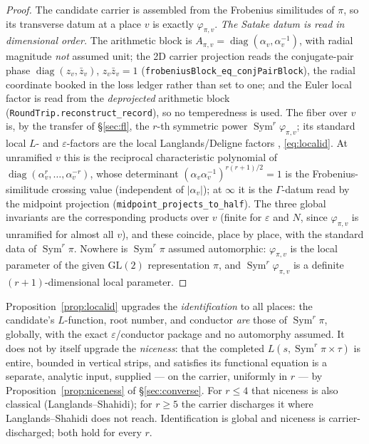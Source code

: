\documentclass[11pt]{article}
\theoremstyle{definition}
\newcommand{\Sym}{\operatorname{Sym}}
\begin{document}
\begin{proof}
The candidate carrier is assembled from the Frobenius similitudes of $\pi$, so its transverse datum at a
place $v$ is exactly $\varphi_{\pi,v}$. \emph{The Satake datum is read in dimensional order.} The arithmetic
block is $A_{\pi,v}=\operatorname{diag}(\alpha_v,\alpha_v^{-1})$, with radial magnitude \emph{not} assumed
unit; the 2D carrier projection reads the conjugate-pair phase $\operatorname{diag}(z_v,\bar z_v)$, $z_v\bar
z_v=1$ (\texttt{frobeniusBlock\_eq\_conjPairBlock}), the radial coordinate booked in the loss ledger rather
than set to one; and the Euler local factor is read from the \emph{deprojected} arithmetic block
(\texttt{RoundTrip.reconstruct\_record}), so no temperedness is used. The fiber over $v$ is, by the transfer
of \S\ref{sec:fl}, the $r$-th symmetric power $\Sym^r\varphi_{\pi,v}$; its standard local $L$- and
$\varepsilon$-factors are the local Langlands/Deligne factors \cite{Tate}, \eqref{eq:localid}. At unramified
$v$ this is the reciprocal characteristic polynomial of
$\operatorname{diag}(\alpha_v^{r},\dots,\alpha_v^{-r})$, whose determinant
$(\alpha_v\alpha_v^{-1})^{r(r+1)/2}=1$ is the Frobenius-similitude crossing value (independent of
$|\alpha_v|$); at $\infty$ it is the $\Gamma$-datum read by the midpoint projection
(\texttt{midpoint\_projects\_to\_half}). The three global invariants are the corresponding products over
$v$ (finite for $\varepsilon$ and $N$, since $\varphi_{\pi,v}$ is unramified for almost all $v$), and
these coincide, place by place, with the standard data of $\Sym^r\pi$. Nowhere is $\Sym^r\pi$ assumed
automorphic: $\varphi_{\pi,v}$ is the local parameter of the given $\mathrm{GL}(2)$ representation $\pi$,
and $\Sym^r\varphi_{\pi,v}$ is a definite $(r{+}1)$-dimensional local parameter.
\end{proof}

Proposition~\ref{prop:localid} upgrades the \emph{identification} to all places: the candidate's
$L$-function, root number, and conductor \emph{are} those of $\Sym^r\pi$, globally, with the exact
$\varepsilon$/conductor package and no automorphy assumed. It does not by itself upgrade the \emph{niceness}: that
the completed $L(s,\Sym^r\pi\times\tau)$ is entire, bounded in vertical strips, and satisfies its
functional equation is a separate, analytic input, supplied --- on the carrier, uniformly in $r$ --- by
Proposition~\ref{prop:niceness} of \S\ref{sec:converse}. For $r\le4$ that niceness is also classical
(Langlands--Shahidi); for $r\ge5$ the carrier discharges it where Langlands--Shahidi does not reach.
Identification is global and niceness is carrier-discharged; both hold for every $r$.
\end{document}
